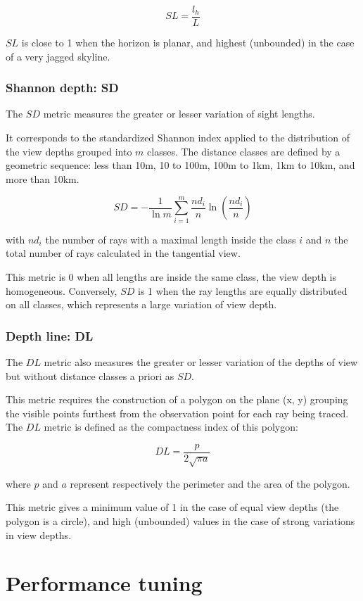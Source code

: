 \documentclass{report}
\begin{document}
$$SL=\frac{l_h}{L}$$

$SL$ is close to 1 when the horizon is planar, and highest (unbounded) in the case of a very jagged skyline.

\subsection{Shannon depth: SD}
The $SD$ metric measures the greater or lesser variation of sight lengths.

It corresponds to the standardized Shannon index applied to the distribution of the view depths grouped into $m$ classes. The distance classes are defined by a geometric sequence: less than 10m, 10 to 100m, 100m to 1km, 1km to 10km, and more than 10km.

$$SD = -\frac{1}{\ln m}\sum_{i=1}^{m}\frac{nd_i}{n}\ln\left(\frac{nd_i}{n}\right)$$

with $nd_i$ the number of rays with a maximal length inside the class $i$ and $n$ the total number of rays calculated in the tangential view.

This metric is 0 when all lengths are inside the same class, the view depth is homogeneous. Conversely, $SD$ is 1 when the ray lengths are equally distributed on all classes, which represents a large variation of view depth.


\subsection{Depth line: DL}
The $DL$ metric also measures the greater or lesser variation of the depths of view but without distance classes a priori as $SD$.

This metric requires the construction of a polygon on the plane (x, y) grouping the visible points furthest from the observation point for each ray being traced. The $DL$ metric is defined as the compactness index of this polygon:

$$DL=\frac{p}{2\sqrt{\pi a}}$$

where $p$ and $a$ represent respectively the perimeter and the area of the polygon. 

This metric gives a minimum value of 1 in the case of equal view depths (the polygon is a circle), and high (unbounded) values in the case of strong variations in view depths.


\chapter{Performance tuning}
\label{perf}
\end{document}
